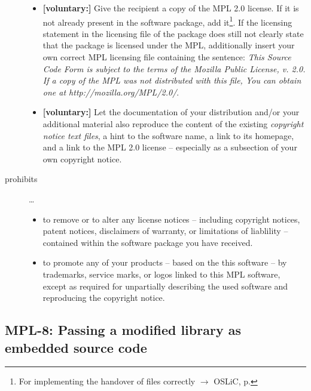 \begin{description}
\begin{itemize}
  \item \textbf{[voluntary:]} Give the recipient a copy of the MPL 2.0 license.
  If it is not already present in the software package, add it\footnote{For
  implementing the handover of files correctly $\rightarrow$ OSLiC, p.
  \pageref{DistributingFilesHint}}. If the licensing statement in the licensing
  file of the package does still not clearly state that the package is licensed
  under the MPL, additionally insert your own correct MPL licensing file
  containing the sentence: \emph{This Source Code Form is subject to the terms
  of the Mozilla Public License, v. 2.0. If a copy of the MPL was not
  distributed with this file, You can obtain one at
  http://mozilla.org/MPL/2.0/}.
  
  \item \textbf{[voluntary:]} Let the documentation of your distribution and/or
  your additional material  also reproduce the content of the existing
  \emph{copyright notice text files}, a hint to the software name, a link to its
  homepage, and a link to the MPL 2.0 license -- especially as a subsection of
  your own copyright notice.
  
\end{itemize}

\item[prohibits] \ldots
\begin{itemize}
  \item to remove or to alter any license notices -- including copyright
  notices, patent notices, disclaimers of warranty, or limitations of liablility
  -- contained within the software package you have received.
  \item to promote any of your products -- based on the this software -- by
  trademarks, service marks, or logos linked to this MPL software, except as
  required for unpartially describing the used software and reproducing the
  copyright notice.
\end{itemize}

\end{description}

\subsection{MPL-8: Passing a modified library as embedded source code}
\label{OSUC-10-MPL}

